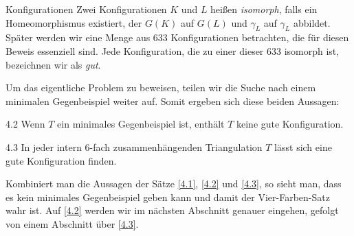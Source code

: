 \begin{section}{Konfigurationen}
 Zwei Konfigurationen $K$ und $L$ heißen \textit{isomorph}, falls ein Homeomorphismus existiert, der $G(K)$ auf $G(L)$ und $\gamma_L$ auf $\gamma_L$ abbildet. Später werden wir eine Menge aus 633 Konfigurationen betrachten, die für diesen Beweis essenziell sind. Jede Konfiguration, die zu einer dieser 633 isomorph ist, bezeichnen wir als \textit{gut}. 
   
 Um das eigentliche Problem zu beweisen, teilen wir die Suche nach einem minimalen Gegenbeispiel weiter auf. Somit ergeben sich diese beiden Aussagen:
   
 \begin{satzl}{}{4.2}
  Wenn $T$ ein minimales Gegenbeispiel ist, enthält $T$ keine gute Konfiguration.
 \end{satzl}
   
 \begin{satzl}{}{4.3}
  In jeder intern 6-fach zusammenhängenden Triangulation $T$ lässt sich eine gute Konfiguration finden.
 \end{satzl}
   
 Kombiniert man die Aussagen der Sätze \ref{4.1}, \ref{4.2} und \ref{4.3}, so sieht man, dass es kein minimales Gegenbeispiel geben kann und damit der Vier-Farben-Satz wahr ist. Auf \ref{4.2} werden wir im nächsten Abschnitt genauer eingehen, gefolgt von einem Abschnitt über \ref{4.3}. 
\end{section}